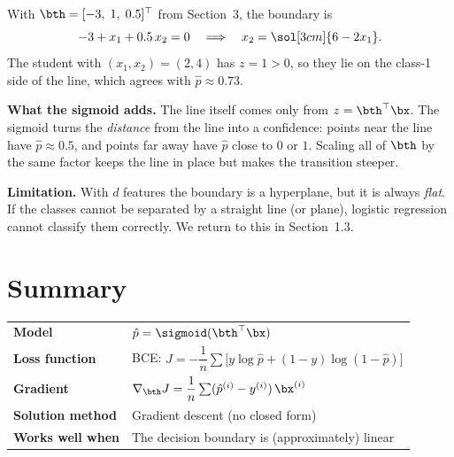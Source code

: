 \documentclass[12pt, a4paper]{article}
\begin{document}
\begin{example}
  With $\bth = [-3,\; 1,\; 0.5]^{\top}$ from Section~3, the boundary is
  \[
    -3 + x_1 + 0.5\,x_2 = 0
    \quad\Longrightarrow\quad
    x_2 = \sol[3cm]{6 - 2x_1}.
  \]
  The student with $(x_1, x_2) = (2, 4)$ has $z = 1 > 0$, so they lie on the
  class-1 side of the line, which agrees with $\hat{p} \approx 0.73$.
\end{example}

\begin{notebox}
  \textbf{What the sigmoid adds.}
  The line itself comes only from $z = \bth^{\top}\bx$.
  The sigmoid turns the \emph{distance} from the line into a confidence:
  points near the line have $\hat{p} \approx 0.5$, and points far away have
  $\hat{p}$ close to $0$ or $1$.
  Scaling all of $\bth$ by the same factor keeps the line in place but makes
  the transition steeper.

  \textbf{Limitation.}
  With $d$ features the boundary is a hyperplane, but it is always
  \emph{flat}. If the classes cannot be separated by a straight line (or plane),
  logistic regression cannot classify them correctly. We return to this in
  Section~1.3.
\end{notebox}


\section{Summary}

\begin{center}
  \renewcommand{\arraystretch}{1.5}
  \begin{tabular}{ll}
    \toprule
    \textbf{Model}           & $\hat{p} = \sigmoid(\bth^{\top}\bx)$                                        \\
    \textbf{Loss function}   & BCE: $J = -\dfrac{1}{n}\sum\bigl[y\log\hat{p} + (1-y)\log(1-\hat{p})\bigr]$ \\
    \textbf{Gradient}        & $\nabla_{\bth}J = \dfrac{1}{n}\sum(\hat{p}^{(i)} - y^{(i)})\,\bx^{(i)}$     \\
    \textbf{Solution method} & Gradient descent (no closed form)                                           \\
    \textbf{Works well when} & The decision boundary is (approximately) linear                             \\
    \bottomrule
  \end{tabular}
\end{center}
\end{document}
